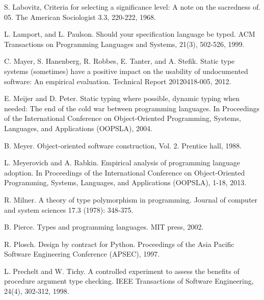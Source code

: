\documentclass[msc]{ppgccufmg}
\begin{document}
\begin{thebibliography}{}
S. Labovitz, Criteria for selecting a significance level: A note on the sacredness of. 05. The American Sociologist 3.3, 220-222, 1968.

L. Lamport, and L. Paulson. Should your specification language be typed. ACM Transactions on Programming Languages and Systems, 21(3), 502-526, 1999.

C. Mayer, S. Hanenberg, R. Robbes, E. Tanter, and A. Stefik. Static type systems (sometimes) have a positive impact on the usability of undocumented software: An empirical evaluation.  Technical Report 20120418-005, 2012.

E. Meijer and D. Peter. Static typing where possible, dynamic typing when needed: The end of the cold war between programming languages. In Proceedings of the International Conference on Object-Oriented Programming, Systems, Languages, and Applications (OOPSLA), 2004.

B. Meyer. Object-oriented software construction, Vol. 2. Prentice hall, 1988.

L. Meyerovich and A. Rabkin. Empirical analysis of programming language adoption. In Proceedings of the International Conference on Object-Oriented Programming, Systems, Languages, and Applications (OOPSLA), 1-18, 2013.

R. Milner. A theory of type polymorphism in programming. Journal of computer and system sciences 17.3 (1978): 348-375.

B. Pierce. Types and programming languages. MIT press, 2002.

R. Plosch. Design by contract for Python. Proceedings of the Asia Pacific Software Engineering Conference (APSEC), 1997.

L. Prechelt and  W. Tichy. A controlled experiment to assess the benefits of procedure argument type checking. IEEE Transactions of Software Engineering, 24(4), 302-312, 1998.


\end{thebibliography}
\end{document}
